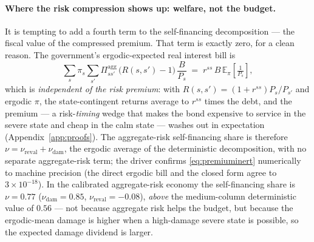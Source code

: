 \documentclass[12pt]{article}
\newcommand{\E}{\mathbb{E}}
\begin{document}
\paragraph{Where the risk compression shows up: welfare, not the budget.}
It is tempting to add a fourth term to the self-financing decomposition ---
the fiscal value of the compressed premium. That term is exactly zero, for
a clean reason. The government's ergodic-expected real interest bill is
\begin{equation}
\sum_s \pi_s \sum_{s'} \Pi^{\mathrm{agg}}_{ss'}\,\big(R(s,s')-1\big)\,\frac{B}{P_s}
\;=\; r^{ss}\,B\,\E_\pi\!\left[\tfrac{1}{P_s}\right],
\label{eq:premiuminert}
\end{equation}
which is \emph{independent of the risk premium}: with
$R(s,s')=(1+r^{ss})P_s/P_{s'}$ and ergodic $\pi$, the state-contingent
returns average to $r^{ss}$ times the debt, and the premium --- a
risk-\emph{timing} wedge that makes the bond expensive to service in the
severe state and cheap in the calm state --- washes out in expectation
(Appendix~\ref{app:proofs}). The aggregate-risk self-financing share is
therefore $\nu=\nu_{\mathrm{reval}}+\nu_{\mathrm{dam}}$, the ergodic average
of the deterministic decomposition, with no separate aggregate-risk term;
the driver confirms \eqref{eq:premiuminert} numerically to machine precision
(the direct ergodic bill and the closed form agree to $3\times10^{-18}$). In
the calibrated aggregate-risk economy the self-financing share is
$\nu=0.77$ ($\nu_{\mathrm{dam}}=0.85$, $\nu_{\mathrm{reval}}=-0.08$),
\emph{above} the medium-column deterministic value of $0.56$ --- not because
aggregate risk helps the budget, but because the ergodic-mean damage is
higher when a high-damage severe state is possible, so the expected damage
dividend is larger.
\end{document}
